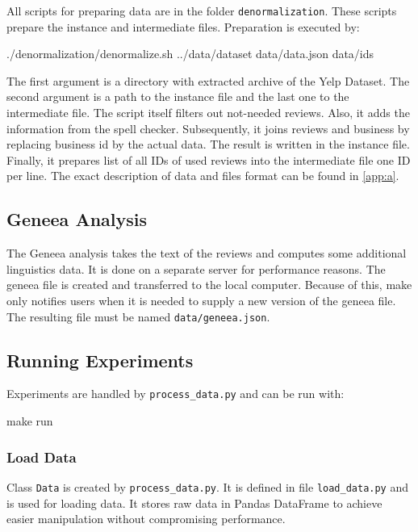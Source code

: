 All scripts for preparing data are in the folder \texttt{denormalization}.
These scripts prepare the instance and intermediate files.
Preparation is executed by:

\begin{code}
./denormalization/denormalize.sh ../data/dataset data/data.json data/ids
\end{code}

The first argument is a directory with extracted archive of the Yelp Dataset.
The second argument is a path to the instance file and the last one to the intermediate file.
The script itself filters out not-needed reviews.
Also, it adds the information from the spell checker.
Subsequently, it joins reviews and business by replacing business id by the actual data.
The result is written in the instance file.
Finally, it prepares list of all IDs of used reviews into the intermediate file one ID per line.
The exact description of data and files format can be found in \autoref{app:a}.



\subsection{Geneea Analysis}

The Geneea analysis takes the text of the reviews and computes some additional linguistics data.
It is done on a separate server for performance reasons.
The geneea file is created and transferred to the local computer.
Because of this, make only notifies users when it is needed to supply a new version of the geneea file.
The resulting file must be named \texttt{data/geneea.json}.



\subsection{Running Experiments}

Experiments are handled by \texttt{process\_data.py} and can be run with:

\begin{code}
make run
\end{code}


\subsubsection{Load Data}

Class \texttt{Data} is created by \texttt{process\_data.py}.
It is defined in file \texttt{load\_data.py} and is used for loading data.
It stores raw data in Pandas DataFrame to achieve easier manipulation without compromising performance.

